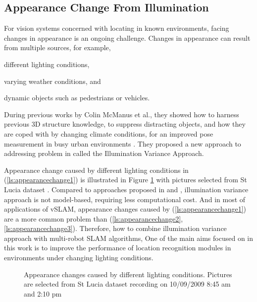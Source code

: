 \subsection{Appearance Change From Illumination}

For vision systems concerned with locating in known environments, facing changes in appearance is an ongoing challenge. Changes in appearance can result from multiple sources, for example, 
\begin{inparaenum}[(i)]
	\item different lighting conditions,	
	\label{ls:appearancechange1}
	\item varying weather conditions, and
	\label{ls:appearancechange2}
	\item dynamic objects such as pedestrians or vehicles.
	\label{ls:appearancechange3}
\end{inparaenum}

During previous works by Colin McManus et al., they showed how to harness previous 3D structure knowledge, to suppress distracting objects, and how they are coped with by changing climate conditions, for an improved pose measurement in busy urban environments  \cite{churchill2012practice}. They proposed a new approach to addressing problem in \cite{maddern2014illumination} called the Illumination Variance Approach. 

Appearance change caused by different lighting conditions in (\ref{ls:appearancechange1}) is illustrated in Figure \ref{fig:shadecompare1} with pictures selected from St Lucia dataset \cite{glover2010fab}. Compared to approaches proposed in \cite{mcmanus2013distraction} and \cite{churchill2012practice}, illumination variance approach is not model-based, requiring less computational cost. And in most of applications of vSLAM, appearance changes caused by (\ref{ls:appearancechange1}) are a more common problem than (\ref{ls:appearancechange2}, \ref{ls:appearancechange3}). Therefore, how to combine illumination variance approach with multi-robot SLAM algorithms, One of the main aims focused on in this work is to improve the performance of location recognition modules in environments under changing lighting conditions.

\begin{figure}
	\centering
	\caption{Appearance changes caused by different lighting conditions. Pictures are selected from St Lucia dataset recording on 10/09/2009 8:45 am and 2:10 pm}
	\label{fig:shadecompare1}
\end{figure}

